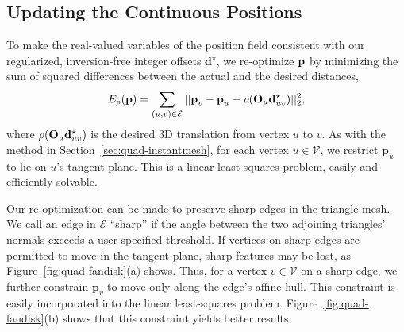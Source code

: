 \subsection{Updating the Continuous Positions}
\label{sec:quad-postoptimize}

To make the real-valued variables of the position field consistent with our regularized, inversion-free integer offsets ${\textbf{d}}^{\star}$, we re-optimize $\mathbf{p}$ by minimizing the sum of squared differences between the actual and the desired distances,
\begin{equation}
E_{p}(\textbf{p}) = \sum_{(u, v) \in \mathcal{E}} ||\textbf{p}_v-\textbf{p}_u-\rho(\mathbf{O}_u{\mathbf{d}}_{uv}^{\star})||_2^2,
\label{eq:quad-post}
\end{equation}
where $\rho(\mathbf{O}_u{\mathbf{d}}_{uv}^{\star})$ is the desired 3D translation from vertex $u$ to $v$.
As with the method in Section~\ref{sec:quad-instantmesh}, for each vertex $u \in \mathcal{V}$, we restrict $\mathbf{p}_u$ to lie on $u$'s tangent plane.  This is a linear least-squares problem, easily and efficiently solvable.

Our re-optimization can be made to preserve sharp edges in the triangle mesh. We call an edge in $\mathcal{E}$ ``sharp'' if the angle between the two adjoining triangles' normals exceeds a user-specified threshold. If vertices on sharp edges are permitted to move in the tangent plane, sharp features may be lost, as Figure~\ref{fig:quad-fandisk}(a) shows. Thus, for a vertex $v\in\mathcal{V}$ on a sharp edge, we further constrain $\mathbf{p}_v$ to move only along the edge's affine hull. This constraint is easily incorporated into the linear least-squares problem. Figure~\ref{fig:quad-fandisk}(b) shows that this constraint yields better results.

